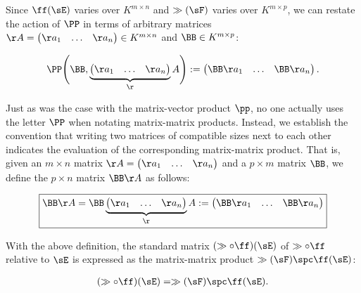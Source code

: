 \begin{deriv}
    Since $\ff(\sE)$ varies over $K^{m \times n}$ and $\gg(\sF)$ varies over $K^{m \times p}$, we can restate the action of $\PP$ in terms of arbitrary matrices $\AA = \begin{pmatrix} \aa_1 & \hdots & \aa_n \end{pmatrix} \in K^{m \times n}$ and $\BB \in K^{m \times p}$:
    
    \begin{align*}
        \PP \Bigg(\BB, \underbrace{\begin{pmatrix} \aa_1 & \hdots & \aa_n \end{pmatrix}}_\AA \Bigg) := 
        \begin{pmatrix} \BB \aa_1 & \hdots & \BB \aa_n \end{pmatrix}.
    \end{align*}
    
    Just as was the case with the matrix-vector product $\pp$, no one actually uses the letter $\PP$ when notating matrix-matrix products. Instead, we establish the convention that writing two matrices of compatible sizes next to each other indicates the evaluation of the corresponding matrix-matrix product. That is, given an $m \times n$ matrix $\AA = \begin{pmatrix} \aa_1 & \hdots & \aa_n \end{pmatrix}$ and a $p \times m$ matrix $\BB$, we define the $p \times n$ matrix $\BB \AA$ as follows:

    \begin{align*}
        \boxed
        {
            \BB \AA 
            =
            \BB
            \underbrace
            {\begin{pmatrix} 
                \aa_1 & \hdots & \aa_n
            \end{pmatrix}}_\AA
            := \begin{pmatrix} \BB \aa_1 & \hdots & \BB \aa_n \end{pmatrix}
        }
    \end{align*}
    
    With the above definition, the standard matrix $(\gg \circ \ff)(\sE)$ of $\gg \circ \ff$ relative to $\sE$ is expressed as the matrix-matrix product $\gg(\sF) \spc \ff(\sE)$:
    
    \begin{align*}
        (\gg \circ \ff)(\sE) = \gg(\sF) \spc \ff(\sE).
    \end{align*}
\end{deriv}


